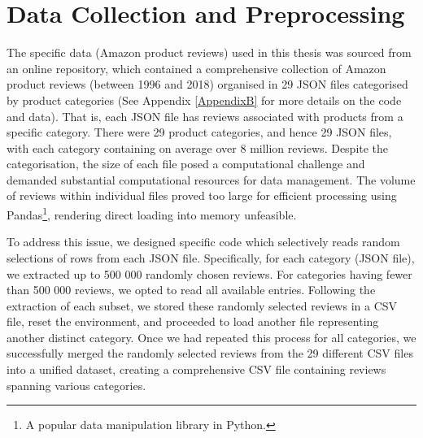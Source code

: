   
\section{Data Collection and Preprocessing}
\label{sec:3 Data Collection and Preprocessing}


The specific data (Amazon product reviews) used in this thesis was sourced from an online repository, which contained a comprehensive collection of Amazon product reviews (between 1996 and 2018) organised in 29 JSON files categorised by product categories \cite{pasricha2018translation} (See Appendix \ref{AppendixB} for more details on the code and data). That is, each JSON file has reviews associated with products from a specific category. There were 29 product categories, and hence 29 JSON files, with each category containing on average over 8 million reviews. Despite the categorisation, the size of each file posed a computational challenge and demanded substantial computational resources for data management. The volume of reviews within individual files proved too large for efficient processing using Pandas\footnote{A popular data manipulation library in Python.}, rendering direct loading into memory unfeasible.

To address this issue, we designed specific code which selectively reads random selections of rows from each JSON file. Specifically, for each category (JSON file), we extracted up to 500 000 randomly chosen reviews. For categories having fewer than 500 000 reviews, we opted to read all available entries. Following the extraction of each subset, we stored these randomly selected reviews in a CSV file, reset the environment, and proceeded to load another file representing another distinct category. Once we had repeated this process for all categories, we successfully merged the randomly selected reviews from the 29 different CSV files into a unified dataset, creating a comprehensive CSV file containing reviews spanning various categories. 


